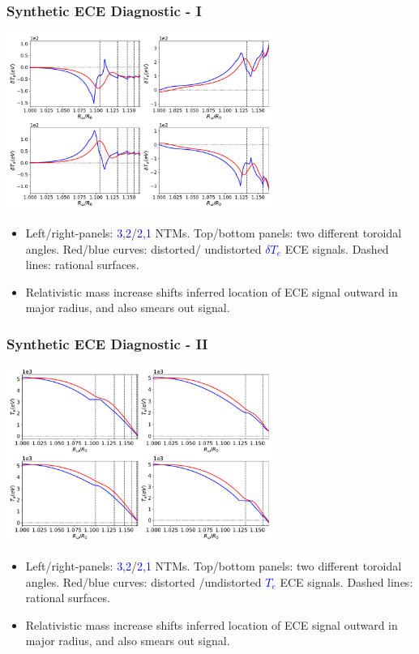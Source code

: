 \documentclass{beamer}
\begin{document}
\begin{frame}
\frametitle{Synthetic ECE Diagnostic - I}
 
 \begin{center}
\includegraphics[width=0.65\textwidth]{../Fig15.pdf}
\end{center}

\begin{itemize}
\item Left/right-panels: \textcolor{blue}{3,2}/\textcolor{blue}{2,1} NTMs. Top/bottom panels: two different toroidal angles. Red/blue curves: distorted/ undistorted \textcolor{blue}{$\delta T_e$} ECE signals. Dashed lines: rational surfaces. 
\item Relativistic mass increase shifts inferred location of ECE signal outward in major radius, and also smears out signal. 
\end{itemize}
 \end{frame}


\begin{frame}
\frametitle{Synthetic ECE Diagnostic - II}
 
 \begin{center}
\includegraphics[width=0.65\textwidth]{../Fig16.pdf}
\end{center}

\begin{itemize}
\item Left/right-panels: \textcolor{blue}{3,2}/\textcolor{blue}{2,1} NTMs. Top/bottom panels: two different toroidal angles. Red/blue curves: distorted /undistorted \textcolor{blue}{$T_e$} ECE signals. Dashed lines: rational surfaces. 
\item Relativistic mass increase shifts inferred location of ECE signal outward in major radius, and also smears out signal. 
\end{itemize}
 \end{frame}
 
\end{document}
